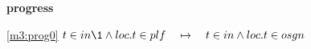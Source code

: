 \textbf{progress}
\begin{block}
\item[ \eqref{m3:prog0} ]$t \in in  %
		\1\land loc.t \in plf  \quad \mapsto\quad t \in in \land loc.t \in osgn $ %
\end{block}

